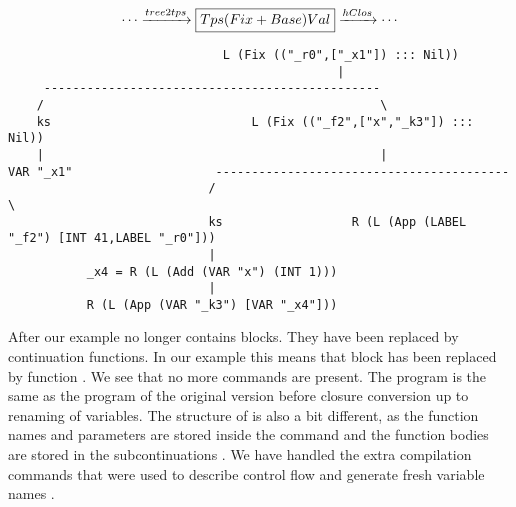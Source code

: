 \begin{landscape}
\begin{gather*}
  \cdots \xrightarrow{tree2tps} \boxed{Tps (Fix + Base) Val} \xrightarrow{hClos} \cdots
\end{gather*}
\begin{lstlisting}
                              L (Fix (("_r0",["_x1"]) ::: Nil))
                                              |
     -----------------------------------------------
    /                                               \
    ks                            L (Fix (("_f2",["x","_k3"]) ::: Nil))
    |                                               |
VAR "_x1"                    -----------------------------------------
                            /                                         \
                            ks                  R (L (App (LABEL "_f2") [INT 41,LABEL "_r0"]))
                            |
           _x4 = R (L (Add (VAR "x") (INT 1)))
                            |
           R (L (App (VAR "_k3") [VAR "_x4"]))

\end{lstlisting}
After  our example no longer contains blocks. They have been replaced by continuation functions. In our example this means that block  has been replaced by function . We see that no more  commands are present. The program is the same as the program of the original version before closure conversion up to renaming of variables. The structure of  is also a bit different, as the function names and parameters are stored inside the  command and the function bodies are stored in the subcontinuations . We have handled the extra compilation commands that were used to describe control flow  and generate fresh variable names .
\end{landscape}
\clearpage

